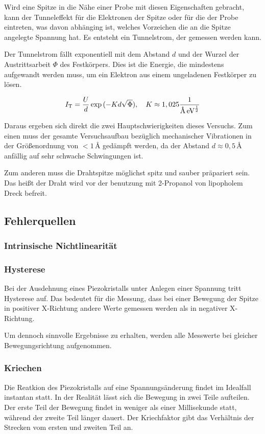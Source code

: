 \noindent Wird eine Spitze in die Nähe einer Probe mit diesen Eigenschaften gebracht, kann der Tunneleffekt für die Elektronen der Spitze oder für die der Probe eintreten, was davon abhänging ist, welches Vorzeichen die an die Spitze angelegte Spannung hat. Es entsteht ein Tunnelstrom, der gemessen werden kann.

\noindent Der Tunnelstrom fällt exponentiell mit dem Abstand \(d\) und der Wurzel der Austrittsarbeit \(\Phi\) des Festkörpers. Dies ist die Energie, die mindestens aufgewandt werden muss, um ein Elektron aus einem ungeladenen Festkörper zu lösen. 

\begin{equation}
I_\text{T}=\frac{U}{d}\exp{(-Kd\sqrt{\Phi})},\quad K\approx1,025\frac{1}{\text{\r{A}}\,\text{eV}^\frac12}
\end{equation}

\noindent Daraus ergeben sich direkt die zwei Hauptschwierigkeiten dieses Versuchs. Zum einen muss der gesamte Versuchsaufbau bezüglich mechanischer Vibrationen in der Größenordnung von \(<1\)\,\r{A} gedämpft werden, da der Abstand \(d\approx0,5\)\,\r{A} anfällig auf sehr schwache Schwingungen ist.  

\noindent Zum anderen muss die Drahtspitze möglichst spitz und sauber präpariert sein. Das heißt der Draht wird vor der benutzung mit 2-Propanol von lipopholem Dreck befreit.

\subsection{Fehlerquellen}
\subsubsection{Intrinsische Nichtlinearität}

\subsubsection{Hysterese}
Bei der Ausdehnung eines Piezokristalls unter Anlegen einer Spannung tritt Hysterese auf.
Das bedeutet für die Messung, dass bei einer Bewegung der Spitze in positiver X-Richtung andere Werte gemessen werden als in negativer X-Richtung.

Um dennoch sinnvolle Ergebnisse zu erhalten, werden alle Messwerte bei gleicher Bewegungsrichtung aufgenommen.

\subsubsection{Kriechen}
Die Reatkion des Piezokristalls auf eine Spannungsänderung findet im Idealfall instantan statt.
In der Realität lässt sich die Bewegung in zwei Teile aufteilen.
Der erste Teil der Bewegung findet in weniger als einer Millisekunde statt, während der zweite Teil länger dauert.
Der Kriechfaktor gibt das Verhältnis der Strecken vom ersten und zweiten Teil an.

